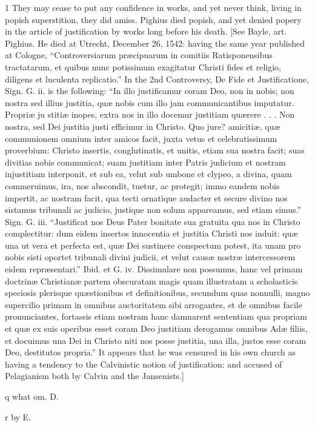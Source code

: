 1
They may cease to put any confidence in works, and yet never think, living in popish superstition, they did amiss. Pighius died popish, and yet denied popery in the article of justification by works long before his death. [See Bayle, art. Pighius. He died at Utrecht, December 26, 1542: having the same year published at Cologne, “Controversiarum præcipuarum in comitiis Ratisponensibus tractatarum, et quibus nunc potissimum exagitatur Christi fides et religio, diligens et luculenta replicatio.” In the 2nd Controversy, De Fide et Justificatione, Sign. G. ii. is the following: “In illo justificamur coram Deo, non in nobis; non nostra sed illius justitia, quæ nobis cum illo jam communicantibus imputatur. Propriæ ju stitiæ inopes, extra nos in illo docemur justitiam quærere . . . Non nostra, sed Dei justitia justi efficimur in Christo. Quo jure? amicitiæ, quæ communionem omnium inter amicos facit, juxta vetus et celebratissimum proverbium: Christo insertis, conglutinatis, et unitis, etiam sua nostra facit; suas divitias nobis communicat; suam justitiam inter Patris judicium et nostram injustitiam interponit, et sub ea, velut sub umbone et clypeo, a divina, quam commeruimus, ira, nos abscondit, tuetur, ac protegit; immo eandem nobis impertit, ac nostram facit, qua tecti ornatique audacter et secure divino nos sistamus tribunali ac judicio, justique non solum appareamus, sed etiam simus.” Sign. G. iii. “Justificat nos Deus Pater bonitate sua gratuita qua nos in Christo complectitur: dum eidem insertos innocentia et justitia Christi nos induit: quæ una ut vera et perfecta est, quæ Dei sustinere conspectum potest, ita unam pro nobis sisti oportet tribunali divini judicii, et velut causæ nostræ intercessorem eidem repræsentari.” Ibid. et G. iv. Dissimulare non possumus, hanc vel primam doctrinæ Christianæ partem obscuratam magis quam illustratam a scholasticis speciosis plerisque quæstionibus et definitionibus, secundum quas nonnulli, magno supercilio primam in omnibus auctoritatem sibi arrogantes, et de omnibus facile pronunciantes, fortassis etiam nostram hanc damnarent sententiam qua propriam et quæ ex suis operibus esset coram Deo justitiam derogamus omnibus Adæ filiis, et docuimus una Dei in Christo niti nos posse justitia, una illa, justos esse coram Deo, destitutos propria.” It appears that he was censured in his own church as having a tendency to the Calvinistic notion of justification: and accused of Pelagianism both by Calvin and the Jansenists.]

q
what om. D.

r
by E.

